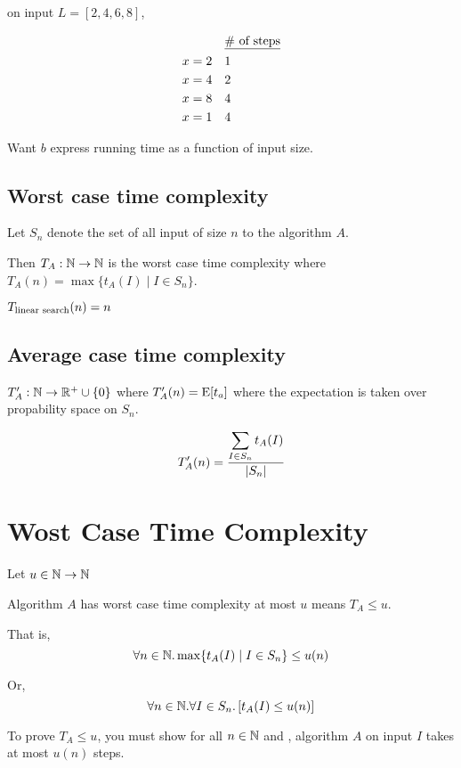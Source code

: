 \documentclass[11pt, cyan, night, 0.5in]{hw}
\begin{document}
on input $L=[2,4,6,8]$, 


\begin{align*}
    & && \text{\underline{\# of steps}}\\
    x&=2 && 1\\
    x&=4 && 2\\
    x&=8 && 4\\
    x&=1 && 4\\
\end{align*}

Want $b$ express running time as a function of input size. 

\subsection{Worst case time complexity}

Let $S_n$ denote the set of all input of size $n$ to the algorithm $A$. 

Then $T_A:\mathbb{N}\to\mathbb{N}$ is the worst case time complexity where $T_A(n)=\max\{t_A(I)\mid I\in S_n\}$.

$T_{\text{linear search}}(n)=n$

\subsection{Average case time complexity}

$T'_A:\mathbb{N}\to\mathbb{R}^+\cup\{0\}$ where $T'_A(n)=\text{E}[t_a]$ where the expectation is taken over propability space on $S_n$. 

\[T'_A(n)=\frac{\displaystyle\sum_{I\in S_n} t_A(I)}{|S_n|}\] 


\section{Wost Case Time Complexity}

Let $u\in\mathbb{N}\to\mathbb{N}$

Algorithm $A$ has worst case time complexity at most $u$ means $T_A\leq u$.

That is, \[\forall n\in\mathbb{N}. \max\{t_A(I)\mid I\in S_n\}\leq u(n)\]

Or, \[\forall n\in\mathbb{N}.\mathbf{\forall} I\in S_n. \left[t_A(I)\leq u(n)\right]\]

To prove $T_A\leq u$, you must show for all $n\in\mathbb{N}$ and , algorithm $A$ on input $I$ takes at most $u(n)$ steps. 

\end{document}
